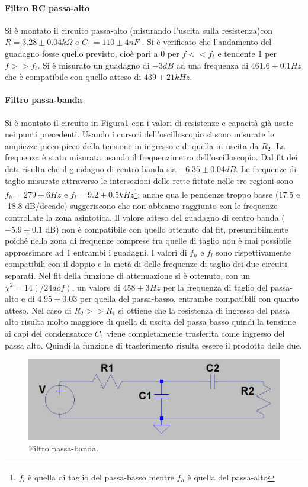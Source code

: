 \documentclass[10pt,a4paper]{article}
\begin{document}
\paragraph{Filtro RC passa-alto}
Si è montato il circuito passa-alto (misurando l'uscita sulla resistenza)con $R= 3.28 \pm 0.04 k\Omega $ e $C_1= 110 \pm 4 nF $ . Si è verificato che l'andamento del guadagno fosse quello previsto, cioè pari a 0 per $f << f_t$ e tendente 1 per $f>> f_t$. Si è misurato un guadagno di $-3 dB$ ad una frequenza di $461.6 \pm 0.1 Hz$  che è compatibile con quello atteso di $439 \pm 21 kHz$.
\paragraph{Filtro passa-banda}
Si è montato il circuito in Figura\ref{passa_banda} con i valori di resistenze e capacità già usate nei punti precedenti. Usando i cursori dell'oscilloscopio si sono misurate le ampiezze picco-picco della tensione in ingresso e di quella in uscita da $R_2$. La frequenza è stata misurata usando il frequenzimetro dell'oscilloscopio. Dal fit dei dati risulta che il guadagno di centro banda sia $-6.35 \pm 0.04 dB$. Le frequenze di taglio misurate attraverso le intersezioni delle rette fittate nelle tre regioni sono $f_h = 279 \pm 6 Hz $ e $f_l = 9.2 \pm 0.5 kHz$\footnote{$f_l$ è quella di taglio del passa-basso mentre $f_h$ è quella del passa-alto}; anche qua le pendenze troppo basse (17.5 e -18.8 dB/decade) suggeriscono che non abbiamo raggiunto con le frequenze controllate la zona asintotica. Il valore atteso del guadagno di centro banda ($-5.9 \pm 0.1$ dB) non è compatibile con quello ottenuto dal fit, presumibilmente poiché nella zona di frequenze comprese tra quelle di taglio non è mai possibile approssimare ad 1 entrambi i guadagni. I valori di $f_h$ e $f_l$ sono rispettivamente compatibili con il doppio e la metà di delle frequenze di taglio dei due circuiti separati.
Nel fit della funzione di attenuazione si è ottenuto, con un $\chi^2=14 (/24 dof)$, un valore di $458 \pm 3 Hz$ per la frequenza di taglio del passa-alto e di $4.95 \pm 0.03$ per quella del passa-basso, entrambe compatibili con quanto atteso.
Nel caso di $R_2 >> R_1$ si ottiene che la resistenza di ingresso del passa alto risulta molto maggiore di quella di uscita del passa basso quindi la tensione ai capi del condensatore $C_1$ viene completamente trasferita come ingresso del passa alto. Quindi la funzione di trasferimento risulta essere il prodotto delle due.

\begin{figure}
\centering
\includegraphics[scale=0.4]{passa_banda.png}
\caption{Filtro passa-banda.\label{passa_banda}}
\end{figure}
\end{document}
